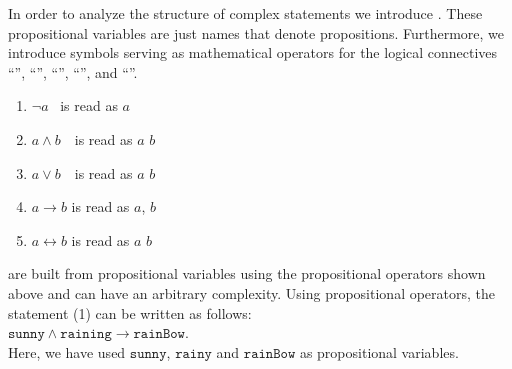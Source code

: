 In order to analyze the structure of complex statements we introduce 
.
These propositional variables are just names that denote propositions.
Furthermore, we introduce symbols serving as mathematical operators for the logical connectives
``'', ``'', ``'', ``'', and 
``''.
\begin{enumerate}
\item $\neg a$ \quad\quad\ is read as \quad {} $a$ 
      \vspace*{-0.2cm}

\item $a \wedge b$ \,\quad\ is read as \quad $a$  $b$
      \vspace*{-0.2cm}

\item $a \vee b$ \,\quad\ is read as \quad $a$  $b$
      \vspace*{-0.2cm}

\item $a \rightarrow b$   \quad is read as \quad {} $a$,  $b$
      \vspace*{-0.2cm}

\item $a \leftrightarrow b$  \quad is read as \quad  $a$  $b$
\end{enumerate}
 are built from propositional variables using the propositional operators shown
above and can have an arbitrary complexity.
Using propositional operators, the statement (1) can be written as follows:
 \\[0.2cm]
\hspace*{1.3cm}
$\texttt{sunny} \wedge \texttt{raining} \rightarrow \texttt{rainBow}$.
\\[0.2cm]
Here, we have used  $\texttt{sunny}$, $\texttt{rainy}$ and $\texttt{rainBow}$ as propositional variables.

